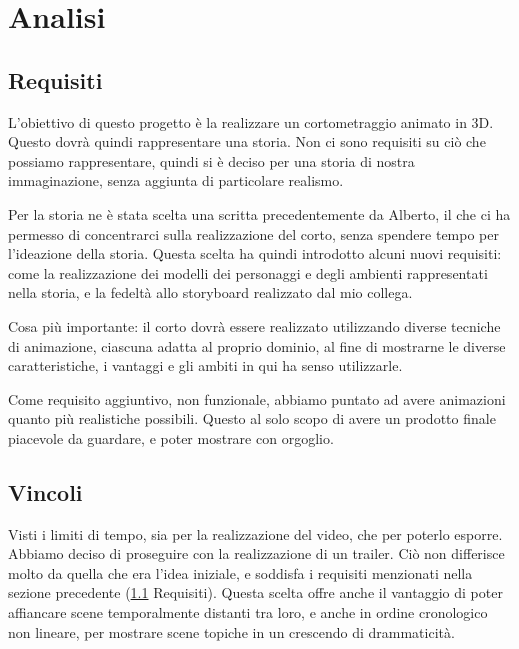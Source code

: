 
\chapter{Analisi} %

\label{Chapter2} %

\section{Requisiti} \label{req}
L'obiettivo di questo progetto è la realizzare un cortometraggio animato in 3D.
Questo dovrà quindi rappresentare una storia. Non ci sono requisiti su ciò che possiamo rappresentare, quindi si è deciso per una storia di nostra immaginazione, senza aggiunta di particolare realismo.

Per la storia ne è stata scelta una scritta precedentemente da Alberto, il che ci ha permesso di concentrarci sulla realizzazione del corto, senza spendere tempo per l'ideazione della storia. Questa scelta ha quindi introdotto alcuni nuovi requisiti: come la realizzazione dei modelli dei personaggi e degli ambienti rappresentati nella storia, e la fedeltà allo storyboard realizzato dal mio collega.

Cosa più importante: il corto dovrà essere realizzato utilizzando diverse tecniche di animazione, ciascuna adatta al proprio dominio, al fine di mostrarne le diverse caratteristiche, i vantaggi e gli ambiti in qui ha senso utilizzarle.

Come requisito aggiuntivo, non funzionale, abbiamo puntato ad avere animazioni quanto più realistiche possibili. Questo al solo scopo di avere un prodotto finale piacevole da guardare, e poter mostrare con orgoglio.

\section{Vincoli} 
Visti i limiti di tempo, sia per la realizzazione del video, che per poterlo esporre. Abbiamo deciso di proseguire con la realizzazione di un trailer. Ciò non differisce molto da quella che era l'idea iniziale, e soddisfa i requisiti menzionati nella sezione precedente (\ref{req} Requisiti). Questa scelta offre anche il vantaggio di poter affiancare scene temporalmente distanti tra loro, e anche in ordine cronologico non lineare, per mostrare scene topiche in un crescendo di drammaticità.

